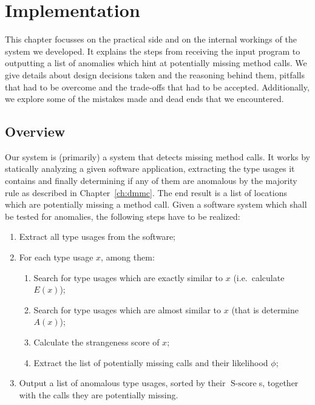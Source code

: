 \chapter{Implementation}\label{ch:impl}

This chapter focusses on the practical side and on the internal workings of the system we developed.
It explains the steps from receiving the input program to outputting a list of anomalies which hint at potentially missing method calls.
We give details about design decisions taken and the reasoning behind them, pitfalls that had to be overcome and the trade-offs that had to be accepted.
Additionally, we explore some of the mistakes made and dead ends that we encountered.

\section{Overview}

Our system is (primarily) a system that detects missing method calls.
It works by statically analyzing a given software application, extracting the type usages it contains and finally determining if any of them are anomalous by the majority rule as described in Chapter~\ref{ch:dmmc}.
The end result is a list of locations which are potentially missing a method call.
Given a software system which shall be tested for anomalies, the following steps have to be realized:

\begin{enumerate}
    \item Extract all type usages from the software;
    \item For each type usage $x$, among them:
    \begin{enumerate}
        \item Search for type usages which are exactly similar to $x$ (i.e.\ calculate $E(x)$);
        \item Search for type usages which are almost similar to $x$ (that is determine $A(x)$);
        \item Calculate the strangeness score of $x$;
        \item Extract the list of potentially missing calls and their likelihood $\phi$;
    \end{enumerate}
    \item Output a list of anomalous type usages, sorted by their $\operatorname{S-score}$s, together with the calls they are potentially missing.
\end{enumerate}

